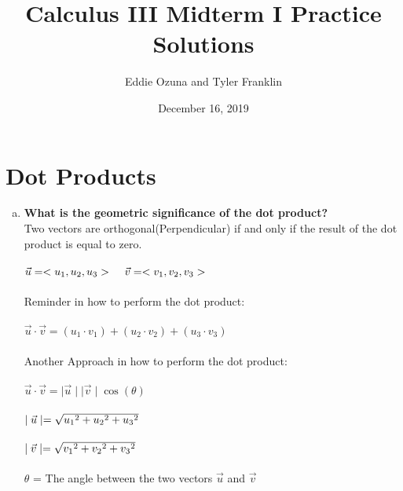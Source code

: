 \documentclass{article}
\title{Calculus III Midterm I Practice Solutions}
\author{Eddie Ozuna and Tyler Franklin}
\date{December 16, 2019}
\begin{document}
\maketitle
\section{Dot Products}
\begin{enumerate}[a.]
	\item \textbf{What is the geometric significance of the dot product? }
	      \\
	      Two vectors are orthogonal(Perpendicular) if and only if the result of the dot product is equal to zero.\\\\
	      $\vec{u} = <u_{1},u_{2},u_{3}>\hspace{.4cm}\vec{v} = <v_{1},v_{2},v_{3}>$\\
	      \\
	      Reminder in how to perform the dot product:\\
	      \\
	      $\vec{u} \cdot \vec{v} = (u_{1} \cdot v_{1}) + (u_{2} \cdot v_{2}) + (u_{3} \cdot v_{3}) $\\
	      \\
	      Another Approach in how to perform the dot product:\\
	      \\
	      $\vec{u} \cdot \vec{v} =  \mid\vec{u}\mid\mid\vec{v}\mid\cos(\theta)$\\
	      \\
	      $\mid\vec{u}\mid = \sqrt{u_{1}\hspace{.001cm}^{2}+u_{2}\hspace{.001cm}^{2}+u_{3}\hspace{.001cm}^{2}}$\\
	      \\
	      $\mid\vec{v}\mid = \sqrt{v_{1}\hspace{.001cm}^{2}+v_{2}\hspace{.001cm}^{2}+v_{3}\hspace{.001cm}^{2}}$\\
	      \\
	      $\theta$ = The angle between the two vectors $\vec{u}$ and $\vec{v}$
\end{enumerate}
\end{document}
